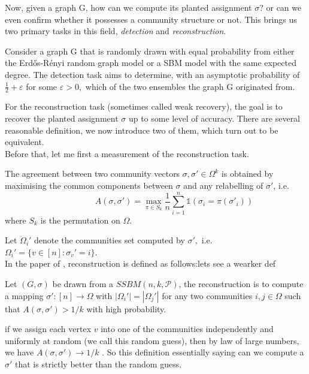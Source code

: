 Now, given a graph G, how can we compute its planted assignment $\sigma$? or  can we even confirm whether it possesses a community structure or not. This brings us two primary tasks in this field, \textit{detection} and \textit{reconstruction}.
\begin{definition}[Detection]
    Consider a graph G that is randomly drawn with equal probability from either the Erd\H{o}s-R\'{e}nyi random graph model or a SBM model with the same expected degree. The detection task aims to determine, with an asymptotic probability of $\frac{1}{2}+\varepsilon$ for some $\varepsilon > 0,$ which of the two ensembles the graph G originated from.
\end{definition}
For the reconstruction task (sometimes called weak recovery), the goal is to recover the planted assignment $\sigma$ up to some level of accuracy. There are several reasonable definition, we now introduce two of them, which turn out to be equivalent.\\
Before that, let me first a measurement of the reconstruction task.
\begin{definition}[Agreement]
The agreement between two community vectors $\sigma, \sigma'\in\Omega^k$ is obtained by maximising the common components between $\sigma$ and any relabelling of $\sigma'$, i.e.\begin{equation}
    ~~~~~~~~~~~~~~~~~~~~A(\sigma, \sigma')=\max_{\pi \in S_k} \frac{1}{n} \sum_{i=1}^{n} \mathbb{1}(\sigma_i = \pi(\sigma'_i))
\end{equation}
where $S_k$ is the permutation on $\Omega$.
\end{definition}
Let $\Omega_i'$ denote the communities set computed by $\sigma',$ i.e. $\Omega_i'=\{v\in[n]: \sigma_v'=i\}.$\\
In the paper of \cite{TheSurvey} \cite{firstpaper}, reconstruction is defined as follows:\textcolor{Mahogany}{lets see a wearker def}
\begin{definition}[Reconstruction]\label{def: recover_1}
Let $(G, \sigma)$ be drawn from a $SSBM(n, k, \mathcal{P})$, the reconstruction is to compute a mapping $\sigma': [n]\rightarrow \Omega$ with $|\Omega_i'|=|\Omega_j'|$ for any two communities $i, j\in\Omega$   such that $A(\sigma, \sigma')> 1/k$ \textcolor{Mahogany}{with high probability.}
\end{definition}
\begin{remark}
    if we assign each vertex $v$ into one of the communities independently and uniformly at random (we call this random guess), then by law of large numbers, we have $A(\sigma, \sigma')\rightarrow 1/k$ \cite{TheSurvey}. So this definition essentially saying can we compute a $\sigma'$ that is strictly better than the random guess.
\end{remark}
